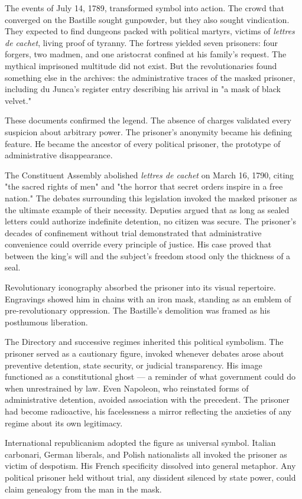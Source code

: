 The events of July 14, 1789, transformed symbol into action. The crowd that converged on the Bastille sought gunpowder, but they also sought vindication. They expected to find dungeons packed with political martyrs, victims of \textit{lettres de cachet}, living proof of tyranny. The fortress yielded seven prisoners: four forgers, two madmen, and one aristocrat confined at his family's request. The mythical imprisoned multitude did not exist. But the revolutionaries found something else in the archives: the administrative traces of the masked prisoner, including du Junca's register entry describing his arrival in "a mask of black velvet."

These documents confirmed the legend. The absence of charges validated every suspicion about arbitrary power. The prisoner's anonymity became his defining feature. He became the ancestor of every political prisoner, the prototype of administrative disappearance.

The Constituent Assembly abolished \textit{lettres de cachet} on March 16, 1790, citing "the sacred rights of men" and "the horror that secret orders inspire in a free nation." The debates surrounding this legislation invoked the masked prisoner as the ultimate example of their necessity. Deputies argued that as long as sealed letters could authorize indefinite detention, no citizen was secure. The prisoner's decades of confinement without trial demonstrated that administrative convenience could override every principle of justice. His case proved that between the king's will and the subject's freedom stood only the thickness of a seal.

Revolutionary iconography absorbed the prisoner into its visual repertoire. Engravings showed him in chains with an iron mask, standing as an emblem of pre-revolutionary oppression. The Bastille's demolition was framed as his posthumous liberation.

The Directory and successive regimes inherited this political symbolism. The prisoner served as a cautionary figure, invoked whenever debates arose about preventive detention, state security, or judicial transparency. His image functioned as a constitutional ghost — a reminder of what government could do when unrestrained by law. Even Napoleon, who reinstated forms of administrative detention, avoided association with the precedent. The prisoner had become radioactive, his facelessness a mirror reflecting the anxieties of any regime about its own legitimacy.

International republicanism adopted the figure as universal symbol. Italian carbonari, German liberals, and Polish nationalists all invoked the prisoner as victim of despotism. His French specificity dissolved into general metaphor. Any political prisoner held without trial, any dissident silenced by state power, could claim genealogy from the man in the mask.

